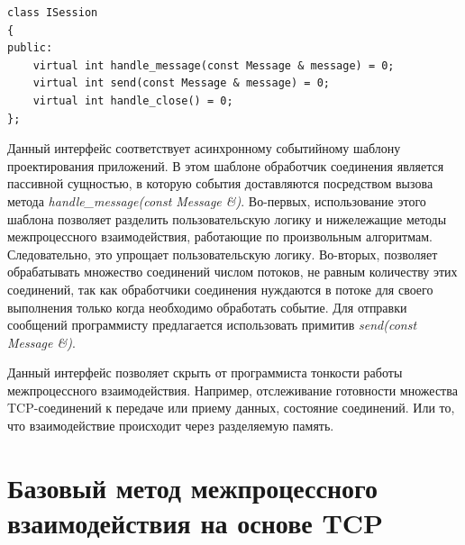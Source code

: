 \begin{lstlisting}[float=!h,caption={Интерфейс пользовательского обработчика соединений на C++},label={chapter31:ServiceHandlerInterface}]
class ISession
{
public:
	virtual int handle_message(const Message & message) = 0;
	virtual int send(const Message & message) = 0;
	virtual int handle_close() = 0;
};
\end{lstlisting}


Данный интерфейс соответствует асинхронному событийному шаблону проектирования приложений. В этом шаблоне обработчик соединения является пассивной сущностью, в которую события доставляются посредством вызова метода \textit{handle\_message(const Message \&)}. Во-первых, использование этого шаблона позволяет разделить пользовательскую логику и нижележащие методы межпроцессного взаимодействия, работающие по произвольным алгоритмам. Следовательно, это упрощает пользовательскую логику. Во-вторых, позволяет обрабатывать множество соединений числом потоков, не равным количеству этих соединений, так как обработчики соединения нуждаются в потоке для своего выполнения только когда необходимо обработать событие. Для отправки сообщений программисту предлагается использовать примитив \textit{send(const Message \&)}.

Данный интерфейс позволяет скрыть от программиста тонкости работы межпроцессного взаимодействия. Например, отслеживание готовности множества TCP-соединений к передаче или приему данных, состояние соединений. Или то, что взаимодействие происходит через разделяемую память.

\section{Базовый метод межпроцессного взаимодействия на основе TCP}\label{chapter31:PureTCP}


